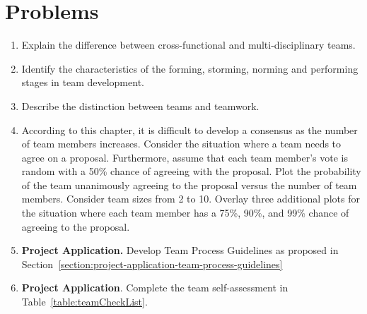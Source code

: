 \section{Problems}
\label{section:problems}

\begin{enumerate}
\def\labelenumi{\arabic{enumi}.}
\item
  Explain the difference between cross-functional and multi-disciplinary
  teams.
\item
  Identify the characteristics of the forming, storming, norming and
  performing stages in team development.
\item
  Describe the distinction between teams and teamwork.
\item
  According to this chapter, it is difficult to develop a consensus as
  the number of team members increases. Consider the situation where a
  team needs to agree on a proposal. Furthermore, assume that each team
  member's vote is random with a 50\% chance of agreeing with the
  proposal. Plot the probability of the team unanimously agreeing to the
  proposal versus the number of team members. Consider team sizes from 2
  to 10. Overlay three additional plots for the situation where each
  team member has a 75\%, 90\%, and 99\% chance of agreeing to the
  proposal.
\item
  \textbf{Project Application.} Develop Team Process Guidelines as
  proposed in 
Section~\ref{section:project-application-team-process-guidelines}
\item
  \textbf{Project Application}. Complete the team self-assessment in
  Table~\ref{table:teamCheckList}.
\end{enumerate}
